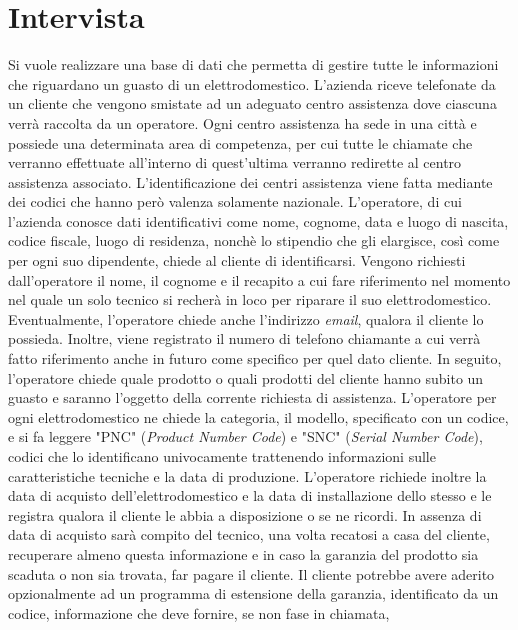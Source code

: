 \documentclass[a4paper, 12pt]{report}
\begin{document}
\section{Intervista}
Si vuole realizzare una base di dati che permetta di gestire tutte le informazioni che riguardano un guasto di un elettrodomestico.
L'azienda riceve telefonate da un cliente che vengono smistate ad un adeguato centro assistenza dove ciascuna verrà raccolta da un operatore.
Ogni centro assistenza ha sede in una città e possiede una determinata area di competenza, per cui tutte le chiamate che verranno effettuate
all'interno di quest'ultima verranno redirette al centro assistenza associato. L'identificazione dei centri assistenza viene fatta mediante dei
codici che hanno però valenza solamente nazionale.\newline
L'operatore, di cui l'azienda conosce dati identificativi come nome, cognome, data e luogo di nascita, codice fiscale, luogo di residenza, nonchè lo 
stipendio che gli elargisce, così come per ogni suo dipendente, chiede al cliente di identificarsi. Vengono richiesti dall'operatore 
il nome, il cognome e il recapito a cui fare riferimento nel momento nel quale un solo tecnico si recherà in loco per riparare il suo elettrodomestico. 
Eventualmente, l'operatore chiede anche l'indirizzo \textit{email}, qualora il cliente lo possieda. Inoltre, viene registrato il numero di telefono 
chiamante a cui verrà fatto riferimento anche in futuro come specifico per quel dato cliente.\newline
In seguito, l'operatore chiede quale prodotto o quali prodotti del cliente hanno subito un guasto e saranno l'oggetto della corrente richiesta di 
assistenza. L'operatore per ogni elettrodomestico ne chiede la categoria, il modello, specificato con un codice, e si fa leggere "PNC" (\textit{Product 
Number Code}) e "SNC" (\textit{Serial Number Code}), codici che lo identificano univocamente trattenendo informazioni sulle caratteristiche tecniche e
la data di produzione. L'operatore richiede inoltre la data di acquisto dell'elettrodomestico e la data di installazione dello stesso e le registra qualora 
il cliente le abbia a disposizione o se ne ricordi. In assenza di data di acquisto sarà compito del tecnico, una volta recatosi a casa del cliente, 
recuperare almeno questa informazione e in caso la garanzia del prodotto sia scaduta o non sia trovata, far pagare il cliente. Il cliente potrebbe avere 
aderito opzionalmente ad un programma di estensione della garanzia, identificato da un codice, informazione che deve fornire, se non fase in chiamata, 
\end{document}

